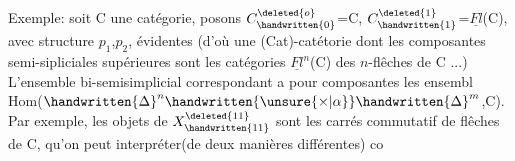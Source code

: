 Exemple: soit C une catégorie, posons $C^{\deleted{o}}_{\handwritten{0}}$=C, $C^{\deleted{1}}_{\handwritten{1}}$=$\underline{Fl}$(C), avec structure
$p_{1}$,$p_{2}$, évidentes (d'où une (Cat)-catétorie dont les composantes semi-sipliciales supérieures sont les catégories $\underline{Fl}^{n}$(C) des $n$-flêches de C ...)
L'ensemble bi-semisimplicial correspondant a pour composantes les ensembl
Hom($\handwritten{\Delta}^{n}\handwritten{\unsure{\times|\alpha}}\handwritten{\Delta}^{m}$,C). Par exemple, les objets de $X^{\deleted{11}}_{\handwritten{11}}$ sont les carrés commutatif
de flêches de C, qu'on peut interpréter(de deux manières différentes) co

